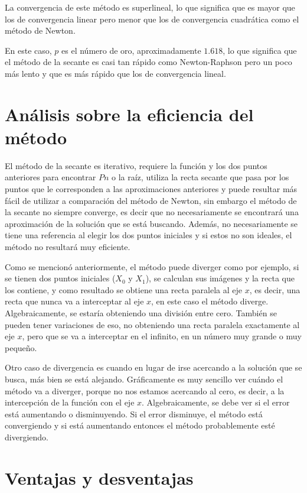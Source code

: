 \documentclass[10pt,technote]{IEEEtran}
\begin{document}
La convergencia de este método es superlineal, lo que significa que es mayor que los de convergencia linear pero menor que los de convergencia cuadrática como el método de Newton.

En este caso, $p$ es el número de oro, aproximadamente $1.618$, lo que significa que el método de la secante es casi tan rápido como Newton-Raphson pero un poco más lento y que es más rápido que los de convergencia lineal.

\section{Análisis sobre la eficiencia del método}

El método de la secante es iterativo, requiere la función y los dos puntos anteriores para encontrar $Pn$ o la raíz, utiliza la recta secante que pasa por los puntos que le corresponden a las aproximaciones anteriores y puede resultar más fácil de utilizar a comparación del método de Newton, sin embargo el método de la secante no siempre converge, es decir que no necesariamente se encontrará una aproximación de la solución que se está buscando.  Además, no necesariamente se tiene una referencia al elegir los dos puntos iniciales y si estos no son ideales, el método no resultará muy eficiente. 

Como se mencionó anteriormente, el método puede diverger como por ejemplo, si se tienen dos puntos iniciales ($X_0$ y $X_1$), se calculan sus imágenes y la recta que los contiene, y como resultado se obtiene una recta paralela al eje $x$, es decir, una recta que nunca va a interceptar al eje $x$, en este caso el método diverge. Algebraicamente, se estaría obteniendo una división entre cero. También se pueden tener variaciones de eso, no obteniendo una recta paralela exactamente al eje $x$, pero que se va a interceptar en el infinito, en un número muy grande o muy pequeño.


Otro caso de divergencia es cuando en lugar de irse acercando a la solución que se busca, más bien se está alejando. Gráficamente es muy sencillo ver cuándo el método va a diverger, porque no nos estamos acercando al cero, es decir, a la intercepción de la función con el eje $x$. Algebraicamente, se debe ver si el error está aumentando o disminuyendo. Si el error disminuye, el método está convergiendo y si está aumentando entonces el método probablemente esté divergiendo. 


\section{Ventajas y desventajas}
\end{document}
